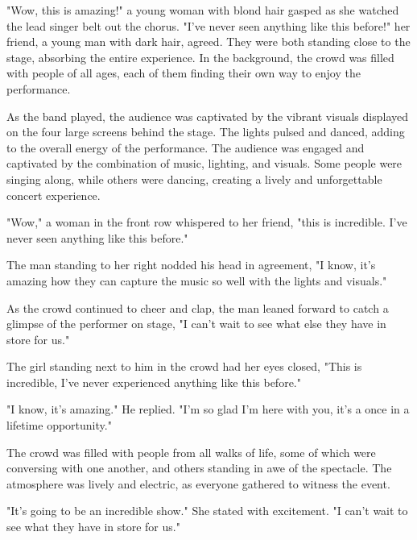 \documentclass[smalldemyvopaper,11pt,twoside,onecolumn,openright,extrafontsizes]{memoir}
\begin{document}
"Wow, this is amazing!" a young woman with blond hair gasped as she watched the lead singer belt out the chorus. "I've never seen anything like this before!" her friend, a young man with dark hair, agreed. They were both standing close to the stage, absorbing the entire experience. In the background, the crowd was filled with people of all ages, each of them finding their own way to enjoy the performance.\par
As the band played, the audience was captivated by the vibrant visuals displayed on the four large screens behind the stage. The lights pulsed and danced, adding to the overall energy of the performance. The audience was engaged and captivated by the combination of music, lighting, and visuals. Some people were singing along, while others were dancing, creating a lively and unforgettable concert experience.\par
"Wow," a woman in the front row whispered to her friend, "this is incredible. I've never seen anything like this before."\par
The man standing to her right nodded his head in agreement, "I know, it's amazing how they can capture the music so well with the lights and visuals."\par
As the crowd continued to cheer and clap, the man leaned forward to catch a glimpse of the performer on stage, "I can't wait to see what else they have in store for us."\par
The girl standing next to him in the crowd had her eyes closed, "This is incredible, I've never experienced anything like this before."\par
"I know, it's amazing." He replied. "I'm so glad I'm here with you, it's a once in a lifetime opportunity."\par
The crowd was filled with people from all walks of life, some of which were conversing with one another, and others standing in awe of the spectacle. The atmosphere was lively and electric, as everyone gathered to witness the event.\par
"It's going to be an incredible show." She stated with excitement. "I can't wait to see what they have in store for us."\par
\end{document}
